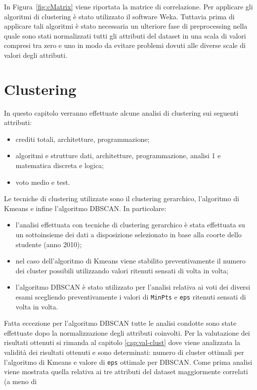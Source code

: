 \documentclass[12pt]{article}
\begin{document}
In Figura~\ref{fig:cMatrix} viene riportata la matrice di correlazione.
Per applicare gli algoritmi di clustering è stato utilizzato il software Weka. Tuttavia prima di applicare tali algoritmi è stato necessaria un ulteriore fase di preprocessing
nella quale sono stati normalizzati tutti gli attributi del data\-set in una scala di valori compresi tra zero e uno in modo da evitare problemi dovuti alle diverse scale di valori degli attributi.

\newpage
\section{Clustering}
\label{cap:clust}
In questo capitolo verranno effettuate alcune analisi di clustering sui se\-guenti attributi:
\begin{itemize}
\item crediti totali, architetture, programmazione;
\item algoritmi e strutture dati, architetture, programmazione, analisi 1 e matematica discreta e logica;
\item voto medio e test.
\end{itemize}
Le tecniche di clustering utilizzate sono il clustering gerarchico, l'algori\-tmo di Kmeans e infine l'algoritmo DBSCAN. In particolare:
\begin{itemize}
\item l'analisi effettuata con tecniche di clustering gerarchico è stata effet\-tuata su un sottoinsieme dei dati a disposizione selezionato in base alla coorte dello studente (anno 2010);
\item nel caso dell'algoritmo di Kmeans viene stabilito preventivamente il numero dei cluster possibili utilizzando valori ritenuti sensati di volta in volta;
\item l'algoritmo DBSCAN è stato utilizzato per l'analisi relativa ai voti dei diversi esami scegliendo preventivamente i valori di \texttt{MinPts} e \texttt{eps} ritenuti sensati di volta in volta.
\end{itemize}
Fatta eccezione per l'algoritmo DBSCAN tutte le analisi condotte sono state effettuate dopo la normalizzazione degli attributi coinvolti. 
Per la valutazione dei risultati ottenuti si rimanda al capitolo \ref{cap:val-clust} dove viene ana\-liz\-zata la validità dei risultati ottenuti e sono determinati: 
numero di cluster ottimali per l'algoritmo di Kmeans e valo\-re di \texttt{eps} ottimale per DBSCAN.
Come prima analisi viene mostrata quella relativa ai tre attributi del data\-set maggiormente correlati (a meno di 
\end{document}
